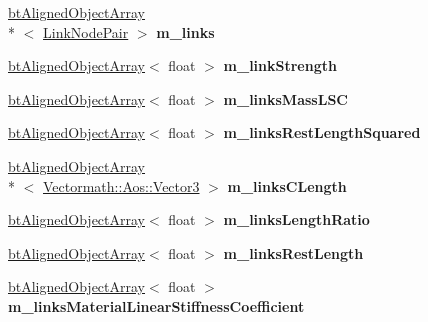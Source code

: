 \begin{DoxyCompactItemize}
\item 
\hypertarget{classbt_soft_body_link_data_a6371f37d378523bcc44ba8831ca6e3ab}{\hyperlink{classbt_aligned_object_array}{bt\+Aligned\+Object\+Array}\\*
$<$ \hyperlink{classbt_soft_body_link_data_1_1_link_node_pair}{Link\+Node\+Pair} $>$ {\bfseries m\+\_\+links}}\label{classbt_soft_body_link_data_a6371f37d378523bcc44ba8831ca6e3ab}

\item 
\hypertarget{classbt_soft_body_link_data_a98d439b5be7538d52790bb3410022648}{\hyperlink{classbt_aligned_object_array}{bt\+Aligned\+Object\+Array}$<$ float $>$ {\bfseries m\+\_\+link\+Strength}}\label{classbt_soft_body_link_data_a98d439b5be7538d52790bb3410022648}

\item 
\hypertarget{classbt_soft_body_link_data_a5391428068e3639ed57324c13ccd727d}{\hyperlink{classbt_aligned_object_array}{bt\+Aligned\+Object\+Array}$<$ float $>$ {\bfseries m\+\_\+links\+Mass\+L\+S\+C}}\label{classbt_soft_body_link_data_a5391428068e3639ed57324c13ccd727d}

\item 
\hypertarget{classbt_soft_body_link_data_a1c87a39609eb7e1225e7d7bd13bbdea5}{\hyperlink{classbt_aligned_object_array}{bt\+Aligned\+Object\+Array}$<$ float $>$ {\bfseries m\+\_\+links\+Rest\+Length\+Squared}}\label{classbt_soft_body_link_data_a1c87a39609eb7e1225e7d7bd13bbdea5}

\item 
\hypertarget{classbt_soft_body_link_data_aaed5c585bdf764e86b865775aa904f8d}{\hyperlink{classbt_aligned_object_array}{bt\+Aligned\+Object\+Array}\\*
$<$ \hyperlink{class_vectormath_1_1_aos_1_1_vector3}{Vectormath\+::\+Aos\+::\+Vector3} $>$ {\bfseries m\+\_\+links\+C\+Length}}\label{classbt_soft_body_link_data_aaed5c585bdf764e86b865775aa904f8d}

\item 
\hypertarget{classbt_soft_body_link_data_aa1d04f92e08a5996316602c5b07982a7}{\hyperlink{classbt_aligned_object_array}{bt\+Aligned\+Object\+Array}$<$ float $>$ {\bfseries m\+\_\+links\+Length\+Ratio}}\label{classbt_soft_body_link_data_aa1d04f92e08a5996316602c5b07982a7}

\item 
\hypertarget{classbt_soft_body_link_data_a3c4ebcde763d925b024c4af0dc390521}{\hyperlink{classbt_aligned_object_array}{bt\+Aligned\+Object\+Array}$<$ float $>$ {\bfseries m\+\_\+links\+Rest\+Length}}\label{classbt_soft_body_link_data_a3c4ebcde763d925b024c4af0dc390521}

\item 
\hypertarget{classbt_soft_body_link_data_a4aa6fcb2ce79e71471f63d968645e083}{\hyperlink{classbt_aligned_object_array}{bt\+Aligned\+Object\+Array}$<$ float $>$ {\bfseries m\+\_\+links\+Material\+Linear\+Stiffness\+Coefficient}}\label{classbt_soft_body_link_data_a4aa6fcb2ce79e71471f63d968645e083}

\end{DoxyCompactItemize}



